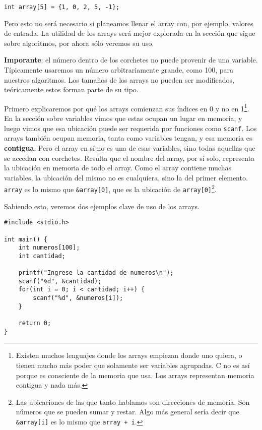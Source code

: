 \documentclass[10pt]{article}
\newcommand{\cscanf}[0]{\lstinline{scanf}}
\begin{document}
\begin{lstlisting}
int array[5] = {1, 0, 2, 5, -1};
\end{lstlisting}

Pero esto no será necesario si planeamos llenar el array con, por ejemplo, valores de entrada. La utilidad de los arrays será mejor explorada en la sección que sigue sobre algoritmos, por ahora sólo veremos su uso.

\bigskip

\textbf{Imporante}: el número dentro de los corchetes no puede provenir de una variable. Típicamente usaremos un número arbitrariamente grande, como 100, para nuestros algoritmos. Los tamaños de los arrays no pueden ser modificados, teóricamente estos forman parte de su tipo.

\bigskip

Primero explicaremos por qué los arrays comienzan sus índices en 0 y no en 1\footnote{Existen muchos lenguajes donde los arrays empiezan donde uno quiera, o tienen mucho más poder que solamente ser variables agrupadas. C no es así porque es consciente de la memoria que usa. Los arrays representan memoria contigua y nada más.}. En la sección sobre variables vimos que estas ocupan un lugar en memoria, y luego vimos que esa ubicación puede ser requerida por funciones como \cscanf. Los arrays también ocupan memoria, tanta como variables tengan, y esa memoria es \textbf{contigua}. Pero el array en sí no es una de esas variables, sino todas aquellas que se accedan con corchetes. Resulta que el nombre del array, por sí solo, representa la ubicación en memoria de todo el array. Como el array contiene muchas variables, la ubicación del mismo no es cualquiera, sino la del primer elemento. \lstinline{array} es lo mismo que \lstinline{&array[0]}, que es la ubicación de \lstinline{array[0]}\footnote{Las ubicaciones de las que tanto hablamos son direcciones de memoria. Son números que se pueden sumar y restar. Algo más general sería decir que \lstinline{&array[i]} es lo mismo que \lstinline{array + i}.}.

\bigskip

Sabiendo esto, veremos dos ejemplos clave de uso de los arrays.

\begin{lstlisting}
#include <stdio.h>

int main() {
	int numeros[100];
	int cantidad;

	printf("Ingrese la cantidad de numeros\n");
	scanf("%d", &cantidad);
	for(int i = 0; i < cantidad; i++) {
		scanf("%d", &numeros[i]);
	}

	return 0;
}
\end{lstlisting}
\end{document}
